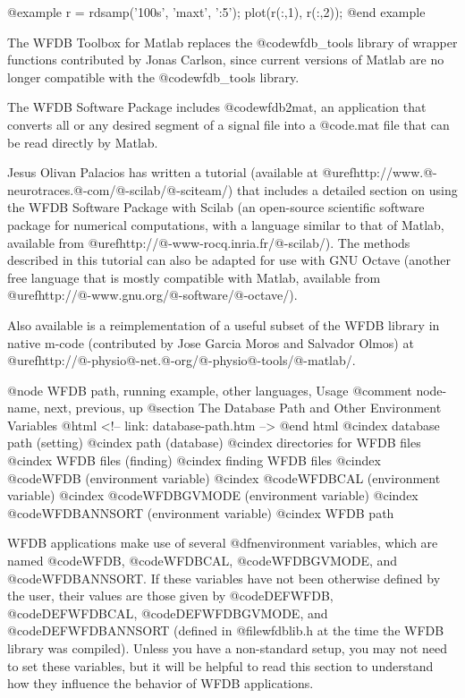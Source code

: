{@example
r = rdsamp('100s', 'maxt', ':5');
plot(r(:,1), r(:,2));
@end example

The WFDB Toolbox for Matlab replaces the @code{wfdb_tools} library of wrapper
functions contributed by Jonas Carlson, since current versions of Matlab are
no longer compatible with the @code{wfdb_tools} library.

The WFDB Software Package includes @code{wfdb2mat}, an application that
converts all or any desired segment of a signal file into a @code{.mat}
file that can be read directly by Matlab. 

Jesus Olivan Palacios has written a tutorial (available at
@uref{http://www.@-neurotraces.@-com/@-scilab/@-sciteam/}) that includes a
detailed section on using the WFDB
Software Package with Scilab (an open-source scientific software
package for numerical computations, with a language similar to that of Matlab,
available from @uref{http://@-www-rocq.inria.fr/@-scilab/}).  The methods
described in this tutorial can also be adapted for use with GNU Octave
(another free language that is mostly compatible with Matlab, available from
@uref{http://@-www.gnu.org/@-software/@-octave/}).

Also available is a reimplementation of a useful subset of the WFDB
library in native m-code (contributed by Jose Garcia Moros and Salvador Olmos)
at @uref{http://@-physio@-net.@-org/@-physio@-tools/@-matlab/}.

@node     WFDB path, running example, other languages, Usage
@comment  node-name,  next,  previous,  up
@section The Database Path and Other Environment Variables
@html
<!-- link: database-path.htm -->
@end html
@cindex database path (setting)
@cindex path (database)
@cindex directories for WFDB files
@cindex WFDB files (finding)
@cindex finding WFDB files
@cindex @code{WFDB} (environment variable)
@cindex @code{WFDBCAL} (environment variable)
@cindex @code{WFDBGVMODE} (environment variable)
@cindex @code{WFDBANNSORT} (environment variable)
@cindex WFDB path

WFDB applications make use of several @dfn{environment variables}, which are
named @code{WFDB}, @code{WFDBCAL}, @code{WFDBGVMODE}, and @code{WFDBANNSORT}.
If these variables have not been otherwise defined by the user, their values
are those given by @code{DEFWFDB}, @code{DEFWFDBCAL}, @code{DEFWFDBGVMODE},
and @code{DEFWFDBANNSORT} (defined in @file{wfdblib.h} at the
time the WFDB library was compiled).  Unless you have a non-standard
setup, you may not need to set these variables, but it will be helpful
to read this section to understand how they influence the behavior of
WFDB applications.

}
